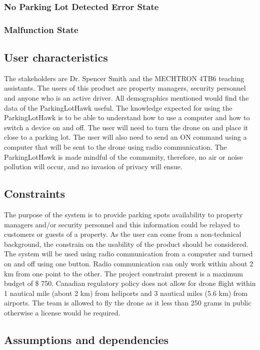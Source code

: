\documentclass{article}
\begin{document}
\subsubsection{No Parking Lot Detected Error State}
\label{No Parking Lot Detected Error State}
\subsubsection{Malfunction State}
\label{Malfunction State}

\subsection{User characteristics}
The stakeholders are Dr. Spencer Smith and the MECHTRON 4TB6 teaching assistants. The users of this product are property managers, security personnel and anyone who is an active driver. All demographics mentioned would find the data of the ParkingLotHawk useful. The knowledge expected for using the ParkingLotHawk is to be able to understand how to use a computer and how to switch a device on and off. The user will need to turn the drone on and place it close to a parking lot. The user will also need to send an ON command using a computer that will be sent to the drone using radio communication. The ParkingLotHawk is made mindful of the community, therefore, no air or noise pollution will occur, and no invasion of privacy will ensue.
\subsection{Constraints}
The purpose of the system is to provide parking spots availability to property managers and/or security personnel and this information could be relayed to customers or guests of a property. As the user can come from a non-technical background, the constrain on the usability of the product should be considered. The system will be used using radio communication from a computer and turned on and off using one button. Radio communication can only work within about 2 km from one point to the other. The project constraint present is a maximum budget of \$ 750.  Canadian regulatory policy does not allow for drone flight within 1 nautical mile (about 2 km) from heliports and 3 nautical miles (5.6 km) from airports. The team is allowed to fly the drone as it less than 250 grams in public otherwise a license would be required.
\subsection{Assumptions and dependencies}
\end{document}

